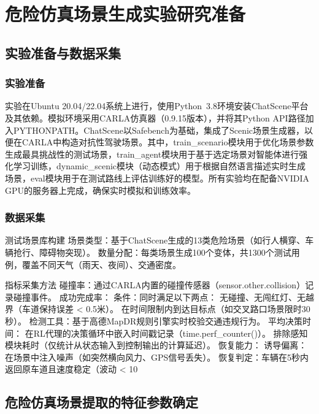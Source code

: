 \chapter{危险仿真场景生成实验研究准备}

\section{实验准备与数据采集}
\subsection{实验准备}

实验在Ubuntu 20.04/22.04系统上进行，使用Python 3.8环境安装ChatScene平台及其依赖​
。模拟环境采用CARLA仿真器（0.9.15版本），并将其Python API路径加入PYTHONPATH​
。ChatScene以Safebench为基础，集成了Scenic场景生成器，以便在CARLA中构造对抗性驾驶场景​
。其中，train\_scenario模块用于优化场景参数生成最具挑战性的测试场景，train\_agent模块用于基于选定场景对智能体进行强化学习训练，dynamic\_scenic模块（动态模式）用于根据自然语言描述实时生成场景，eval模块用于在测试路线上评估训练好的模型。所有实验均在配备NVIDIA GPU的服务器上完成，确保实时模拟和训练效率。

\subsection{数据采集}
测试场景库构建
场景类型：基于ChatScene生成的13类危险场景（如行人横穿、车辆抢行、障碍物突现）。
数量分配：每类场景生成100个变体，共1300个测试用例，覆盖不同天气（雨天、夜间）、交通密度。

指标采集方法
碰撞率：通过CARLA内置的碰撞传感器（sensor.other.collision）记录碰撞事件。
成功完成率：
条件：同时满足以下两点：
无碰撞、无闯红灯、无越界（车道保持误差 < 0.5米）。
在时间限制内到达目标点（如交叉路口场景限时30秒）。
检测工具：基于高德MapDR规则引擎实时校验交通违规行为。
平均决策时间：
在RL代理的决策循环中嵌入时间戳记录（time.perf\_counter()）。
排除感知模块耗时（仅统计从状态输入到控制输出的计算延迟）。
恢复能力：
诱导偏离：在场景中注入噪声（如突然横向风力、GPS信号丢失）。
恢复判定：车辆在5秒内返回原车道且速度稳定（波动 < 10%

\section{危险仿真场景提取的特征参数确定}

